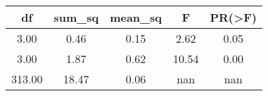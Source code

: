 \begin{tabular}{|c|c|c|c|c|}
\toprule
    df &  sum\_sq &  mean\_sq &     F &  PR(>F) \\
\midrule
  3.00 &    0.46 &     0.15 &  2.62 &    0.05 \\
  3.00 &    1.87 &     0.62 & 10.54 &    0.00 \\
313.00 &   18.47 &     0.06 &   nan &     nan \\
\bottomrule
\end{tabular}
